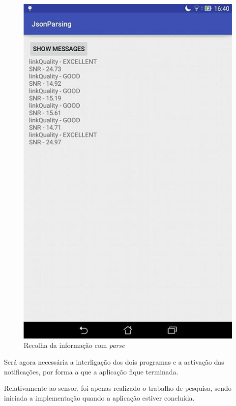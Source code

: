 \documentclass[a4paper]{article}
\begin{document}
\begin{figure}[H]
  \includegraphics[width=\linewidth]{json.jpg}
  \caption{Recolha da informação com \textit{parse}}\label{fig:json}
\endminipage\hfill
\end{figure}

Será agora necessária a interligação dos dois programas e a activação das notificações, por forma a que a aplicação fique terminada.

Relativamente ao sensor, foi apenas realizado o trabalho de pesquisa, sendo iniciada a implementação quando a aplicação estiver concluída.
\end{document}
